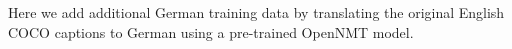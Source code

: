 Here we add additional German training data by translating the original English
COCO captions to German using a pre-trained OpenNMT model.

